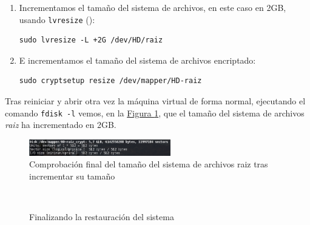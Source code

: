 \documentclass[10pt,a4paper,spanish]{article}
\numberwithin{equation}{section} %
\numberwithin{figure}{section} %
\numberwithin{table}{section} %
\begin{document}
\begin{enumerate}[1.]
\item Incrementamos el tamaño del sistema de archivos, en este caso en 2GB, usando \texttt{lvresize} (\cite{lvresize}):
\begin{verbatim}
sudo lvresize -L +2G /dev/HD/raiz
\end{verbatim}

\item E incrementamos el tamaño del sistema de archivos encriptado:
\begin{verbatim}
sudo cryptsetup resize /dev/mapper/HD-raiz
\end{verbatim}
\end{enumerate}

Tras reiniciar y abrir otra vez la máquina virtual de forma normal, ejecutando el comando \texttt{fdisk -l} vemos, en la \hyperref[finalyay]{Figura \ref*{finalyay}}, que el tamaño del sistema de archivos \textit{raiz} ha incrementado en 2GB.
\begin{figure}[!h]
    \centering
    \includegraphics[width=0.55\textwidth]{31}
    \caption{Comprobación final del tamaño del sistema de archivos raiz tras incrementar su tamaño}
    \label{finalyay}
\end{figure}

\begin{figure}[!h]
\centering
\mbox {
\qquad
{}
}
\caption{Finalizando la restauración del sistema}
\label{finres}
\end{figure}


\end{document}
